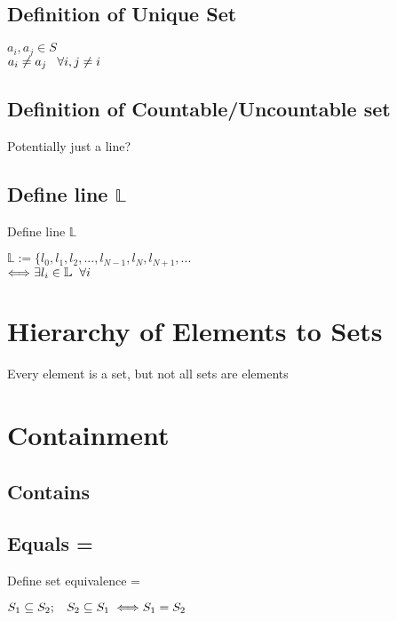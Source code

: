 \documentclass[11pt]{article}
\begin{document}
\subsection{Definition of Unique Set}
\begin{center}
$
a_i, a_j \in S
$
\\
$
a_i \neq a_j \hspace{3mm} \forall i,j \neq i
$
\end{center}





\subsection{Definition of Countable/Uncountable set}
Potentially just a line?
\subsection{Define line $\mathbb{L}$}
Define line $\mathbb{L}$
\begin{center}
$
\mathbb{L} := \{l_0,l_{1},l_{2},...,l_{N-1},l_N,l_{N+1},...
$
\\
$
\Longleftrightarrow \exists l_i \in \mathbb{L} \hspace{2mm} \forall i
$
\end{center}


\section{Hierarchy of Elements to Sets}
Every element is a set, but not all sets are elements







\section{Containment}
\subsection{Contains}
\subsection{Equals = }
Define set equivalence  =
\begin{center}
$
S_1 \subseteq S_2 ; \hspace{3mm} S_2 \subseteq S_1 \hspace{1mm} \Longleftrightarrow S_1 = S_2 \hspace{3mm}
$
\end{center}
\end{document}
